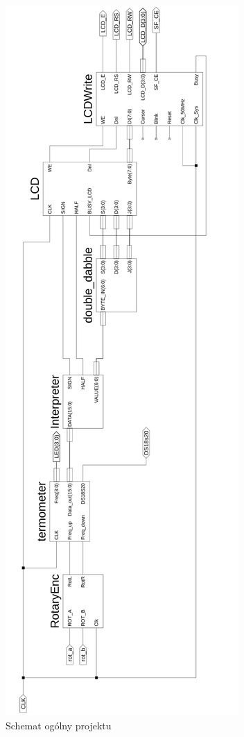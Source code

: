 \documentclass[a4paper]{article}
\begin{document}
\begin{figure}[!h]
\begin{center}
\includegraphics{graphics/top_level.png}
\end{center}
\caption{Schemat ogólny projektu}
\label{top_level}
\end{figure}
\end{document}
